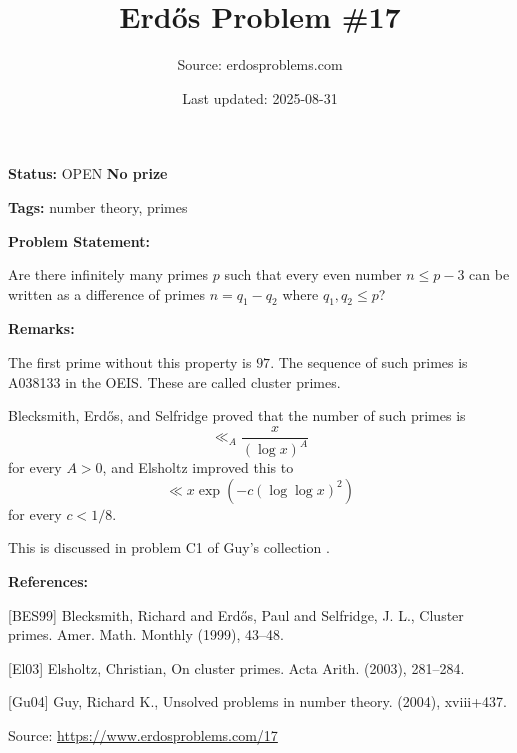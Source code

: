 \documentclass{article}
\title{Erd\H{o}s Problem \#17}
\date{Last updated: 2025-08-31}
\author{Source: erdosproblems.com}
\begin{document}
\maketitle

\noindent\textbf{Status:} OPEN \quad \textbf{No prize}

\noindent\textbf{Tags:} number theory, primes

\medskip
\noindent\textbf{Problem Statement:}

Are there infinitely many primes $p$ such that every even number $n\leq p-3$ can be written as a difference of primes $n=q_1-q_2$ where $q_1,q_2\leq p$?

\bigskip
\noindent\textbf{Remarks:}

The first prime without this property is $97$. The sequence of such primes is A038133 in the OEIS. These are called cluster primes.

Blecksmith, Erd\H{o}s, and Selfridge \cite{BES99} proved that the number of such primes is\[\ll_A \frac{x}{(\log x)^A}\]for every $A>0$, and Elsholtz \cite{El03} improved this to\[\ll x\exp(-c(\log\log x)^2)\]for every $c<1/8$.

This is discussed in problem C1 of Guy's collection \cite{Gu04}.

\bigskip
\noindent\textbf{References:}

[BES99] Blecksmith, Richard and Erd\H{o}s, Paul and Selfridge, J. L., Cluster primes. Amer. Math. Monthly (1999), 43--48.
 
 [El03] Elsholtz, Christian, On cluster primes. Acta Arith. (2003), 281--284.
 
 [Gu04] Guy, Richard K., Unsolved problems in number theory. (2004), xviii+437.

\bigskip
\noindent\small{Source: \url{https://www.erdosproblems.com/17}}
\end{document}
